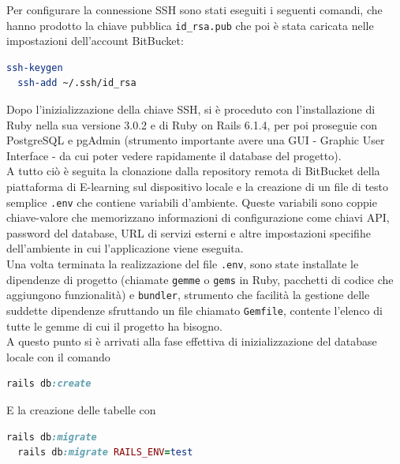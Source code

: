 \documentclass[a4paper, 12pt]{book}
\begin{document}
Per configurare la connessione SSH sono stati eseguiti i seguenti comandi, che hanno prodotto la chiave pubblica
\texttt{id\_rsa.pub} che poi è stata caricata nelle impostazioni dell'account BitBucket:\\

\begin{lstlisting}[language=bash, caption=Generazione della chiave SSH]
  ssh-keygen
  ssh-add ~/.ssh/id_rsa
  \end{lstlisting}

Dopo l'inizializzazione della chiave SSH, si è proceduto con l'installazione di Ruby nella sua versione 3.0.2 e di Ruby
on Rails 6.1.4, per poi proseguie con PostgreSQL e pgAdmin (strumento importante avere una GUI -  Graphic User Interface -
da cui poter vedere rapidamente il database del progetto).\\

A tutto ciò è seguita la clonazione dalla repository remota di BitBucket della piattaforma di E-learning sul dispositivo locale
e la creazione di un file di testo semplice \texttt{.env} che contiene variabili d'ambiente. Queste variabili sono
coppie chiave-valore che memorizzano informazioni di configurazione come chiavi API, password del database, URL di
servizi esterni e altre impostazioni specifihe dell'ambiente in cui l'applicazione viene eseguita.\\

Una volta terminata la realizzazione del file \texttt{.env}, sono state installate le dipendenze di progetto (chiamate
\texttt{gemme} o \texttt{gems} in Ruby, pacchetti di codice che aggiungono funzionalità) e \texttt{bundler}, strumento che
facilità la gestione delle suddette dipendenze sfruttando un file chiamato \texttt{Gemfile},
contente l'elenco di tutte le gemme di cui il progetto ha bisogno.\\

A questo punto si è arrivati alla fase effettiva di inizializzazione del database locale con il comando

\begin{lstlisting}[language=ruby, caption=Inizializzazione del DB locale]
  rails db:create
  \end{lstlisting}

E la creazione delle tabelle con

\begin{lstlisting}[language=ruby, caption=Creazione tabelle]
  rails db:migrate
  rails db:migrate RAILS_ENV=test
  \end{lstlisting}
\end{document}
